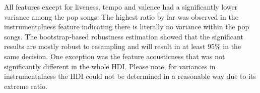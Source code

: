 \documentclass{article}
\begin{document}

All features except for liveness, tempo and valence had a significantly lower variance among the pop songs. The highest ratio by far was observed in the instrumentalness feature indicating there is literally no variance within the pop songs.
The bootstrap-based robustness estimation showed that the significant results are mostly robust to resampling and will result in at least 95\% in the same decision. One exception was the feature acousticness that was not significantly different in the whole HDI. Please note, for variances in instrumentalness the HDI could not be determined in a reasonable way due to its extreme ratio.
\end{document}
